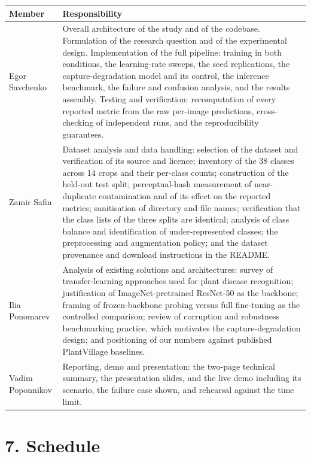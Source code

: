 \documentclass[10pt,a4paper]{article}
\begin{document}
\begin{tabular}{@{}p{3.1cm}p{13.6cm}@{}}
\toprule
\textbf{Member} & \textbf{Responsibility} \\
\midrule
Egor Savchenko &
Overall architecture of the study and of the codebase. Formulation of the research question and of
the experimental design. Implementation of the full pipeline: training in both conditions, the
learning-rate sweeps, the seed replications, the capture-degradation model and its control, the inference benchmark, the
failure and confusion analysis, and the results assembly. Testing and verification: recomputation of
every reported metric from the raw per-image predictions, cross-checking of independent runs, and the
reproducibility guarantees. \\[4pt]
Zamir Safin &
Dataset analysis and data handling: selection of the dataset and verification of its source and
licence; inventory of the 38 classes across 14 crops and their per-class counts; construction of the
held-out test split; perceptual-hash measurement of near-duplicate contamination and of its
effect on the reported metrics; sanitisation of directory
and file names; verification that the class lists of the three splits are identical; analysis of
class balance and identification of under-represented classes; the preprocessing and augmentation
policy; and the dataset provenance and download instructions in the README. \\[4pt]
Ilia Ponomarev &
Analysis of existing solutions and architectures: survey of transfer-learning approaches used for
plant disease recognition; justification of ImageNet-pretrained ResNet-50 as the backbone; framing of
frozen-backbone probing versus full fine-tuning as the controlled comparison; review of corruption
and robustness benchmarking practice, which motivates the capture-degradation design; and
positioning of our numbers against published PlantVillage baselines. \\[4pt]
Vadim Poponnikov &
Reporting, demo and presentation: the two-page technical summary, the presentation slides, and the
live demo including its scenario, the failure case shown, and rehearsal against the time limit. \\
\bottomrule
\end{tabular}

\section*{7. Schedule}
\end{document}

